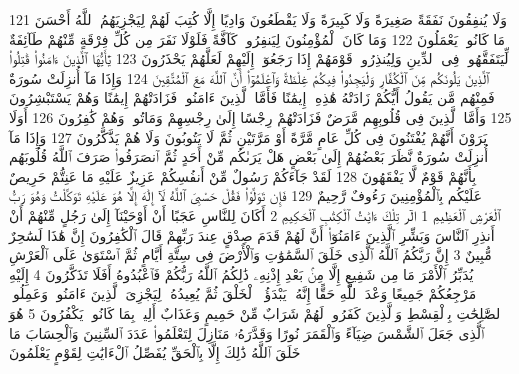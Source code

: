 {\tiny\colorbox{cl_aya}{121}} وَلَا يُنفِقُونَ نَفَقَةً صَغِيرَةً وَلَا كَبِيرَةً وَلَا يَقْطَعُونَ وَادِيًا إِلَّا كُتِبَ لَهُمْ لِيَجْزِيَهُمُ ٱللَّهُ أَحْسَنَ مَا كَانُوا۟ يَعْمَلُونَ
{\tiny\colorbox{cl_aya}{122}} وَمَا كَانَ ٱلْمُؤْمِنُونَ لِيَنفِرُوا۟ كَآفَّةً فَلَوْلَا نَفَرَ مِن كُلِّ فِرْقَةٍ مِّنْهُمْ طَآئِفَةٌ لِّيَتَفَقَّهُوا۟ فِى ٱلدِّينِ وَلِيُنذِرُوا۟ قَوْمَهُمْ إِذَا رَجَعُوٓا۟ إِلَيْهِمْ لَعَلَّهُمْ يَحْذَرُونَ
{\tiny\colorbox{cl_aya}{123}} يَٰٓأَيُّهَا ٱلَّذِينَ ءَامَنُوا۟ قَٰتِلُوا۟ ٱلَّذِينَ يَلُونَكُم مِّنَ ٱلْكُفَّارِ وَلْيَجِدُوا۟ فِيكُمْ غِلْظَةً وَٱعْلَمُوٓا۟ أَنَّ ٱللَّهَ مَعَ ٱلْمُتَّقِينَ
{\tiny\colorbox{cl_aya}{124}} وَإِذَا مَآ أُنزِلَتْ سُورَةٌ فَمِنْهُم مَّن يَقُولُ أَيُّكُمْ زَادَتْهُ هَٰذِهِۦٓ إِيمَٰنًا فَأَمَّا ٱلَّذِينَ ءَامَنُوا۟ فَزَادَتْهُمْ إِيمَٰنًا وَهُمْ يَسْتَبْشِرُونَ
{\tiny\colorbox{cl_aya}{125}} وَأَمَّا ٱلَّذِينَ فِى قُلُوبِهِم مَّرَضٌ فَزَادَتْهُمْ رِجْسًا إِلَىٰ رِجْسِهِمْ وَمَاتُوا۟ وَهُمْ كَٰفِرُونَ
{\tiny\colorbox{cl_aya}{126}} أَوَلَا يَرَوْنَ أَنَّهُمْ يُفْتَنُونَ فِى كُلِّ عَامٍ مَّرَّةً أَوْ مَرَّتَيْنِ ثُمَّ لَا يَتُوبُونَ وَلَا هُمْ يَذَّكَّرُونَ
{\tiny\colorbox{cl_aya}{127}} وَإِذَا مَآ أُنزِلَتْ سُورَةٌ نَّظَرَ بَعْضُهُمْ إِلَىٰ بَعْضٍ هَلْ يَرَىٰكُم مِّنْ أَحَدٍ ثُمَّ ٱنصَرَفُوا۟ صَرَفَ ٱللَّهُ قُلُوبَهُم بِأَنَّهُمْ قَوْمٌ لَّا يَفْقَهُونَ
{\tiny\colorbox{cl_aya}{128}} لَقَدْ جَآءَكُمْ رَسُولٌ مِّنْ أَنفُسِكُمْ عَزِيزٌ عَلَيْهِ مَا عَنِتُّمْ حَرِيصٌ عَلَيْكُم بِٱلْمُؤْمِنِينَ رَءُوفٌ رَّحِيمٌ
{\tiny\colorbox{cl_aya}{129}} فَإِن تَوَلَّوْا۟ فَقُلْ حَسْبِىَ ٱللَّهُ لَآ إِلَٰهَ إِلَّا هُوَ عَلَيْهِ تَوَكَّلْتُ وَهُوَ رَبُّ ٱلْعَرْشِ ٱلْعَظِيمِ
{\tiny\colorbox{cl_aya}{1}} الٓر تِلْكَ ءَايَٰتُ ٱلْكِتَٰبِ ٱلْحَكِيمِ
{\tiny\colorbox{cl_aya}{2}} أَكَانَ لِلنَّاسِ عَجَبًا أَنْ أَوْحَيْنَآ إِلَىٰ رَجُلٍ مِّنْهُمْ أَنْ أَنذِرِ ٱلنَّاسَ وَبَشِّرِ ٱلَّذِينَ ءَامَنُوٓا۟ أَنَّ لَهُمْ قَدَمَ صِدْقٍ عِندَ رَبِّهِمْ قَالَ ٱلْكَٰفِرُونَ إِنَّ هَٰذَا لَسَٰحِرٌ مُّبِينٌ
{\tiny\colorbox{cl_aya}{3}} إِنَّ رَبَّكُمُ ٱللَّهُ ٱلَّذِى خَلَقَ ٱلسَّمَٰوَٰتِ وَٱلْأَرْضَ فِى سِتَّةِ أَيَّامٍ ثُمَّ ٱسْتَوَىٰ عَلَى ٱلْعَرْشِ يُدَبِّرُ ٱلْأَمْرَ مَا مِن شَفِيعٍ إِلَّا مِنۢ بَعْدِ إِذْنِهِۦ ذَٰلِكُمُ ٱللَّهُ رَبُّكُمْ فَٱعْبُدُوهُ أَفَلَا تَذَكَّرُونَ
{\tiny\colorbox{cl_aya}{4}} إِلَيْهِ مَرْجِعُكُمْ جَمِيعًا وَعْدَ ٱللَّهِ حَقًّا إِنَّهُۥ يَبْدَؤُا۟ ٱلْخَلْقَ ثُمَّ يُعِيدُهُۥ لِيَجْزِىَ ٱلَّذِينَ ءَامَنُوا۟ وَعَمِلُوا۟ ٱلصَّٰلِحَٰتِ بِٱلْقِسْطِ وَٱلَّذِينَ كَفَرُوا۟ لَهُمْ شَرَابٌ مِّنْ حَمِيمٍ وَعَذَابٌ أَلِيمٌۢ بِمَا كَانُوا۟ يَكْفُرُونَ
{\tiny\colorbox{cl_aya}{5}} هُوَ ٱلَّذِى جَعَلَ ٱلشَّمْسَ ضِيَآءً وَٱلْقَمَرَ نُورًا وَقَدَّرَهُۥ مَنَازِلَ لِتَعْلَمُوا۟ عَدَدَ ٱلسِّنِينَ وَٱلْحِسَابَ مَا خَلَقَ ٱللَّهُ ذَٰلِكَ إِلَّا بِٱلْحَقِّ يُفَصِّلُ ٱلْءَايَٰتِ لِقَوْمٍ يَعْلَمُونَ
